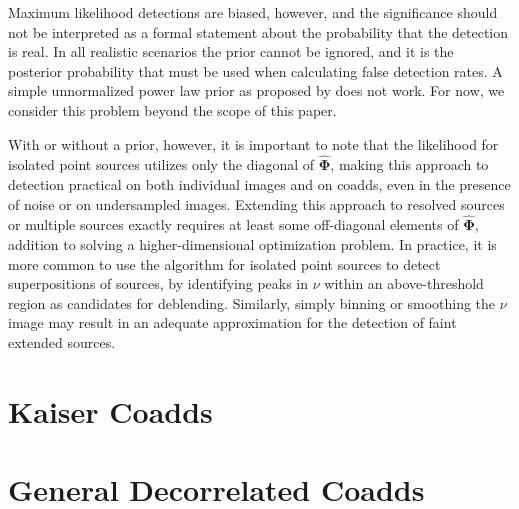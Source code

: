 \documentclass[10pt]{article}
\begin{document}
Maximum likelihood detections are biased, however, and the significance should not be interpreted as a formal statement about the probability that the detection is real.  In all realistic scenarios the prior cannot be ignored, and it is the posterior probability that must be used when calculating false detection rates.  A simple unnormalized power law prior as proposed by \cite{1998PASP..110..727H} does not work.  For now, we consider this problem beyond the scope of this paper.

With or without a prior, however, it is important to note that the likelihood for isolated point sources utilizes only the diagonal of $\hat{\bm{\Phi}}$, making this approach to detection practical on both individual images and on coadds, even in the presence of noise or on undersampled images.  Extending this approach to resolved sources or multiple sources exactly requires at least some off-diagonal elements of $\hat{\bm{\Phi}}$, addition to solving a higher-dimensional optimization problem.  In practice, it is more common to use the algorithm for isolated point sources to detect superpositions of sources, by identifying peaks in $\nu$ within an above-threshold region as candidates for deblending.  Similarly, simply binning or smoothing the $\nu$ image may result in an adequate approximation for the detection of faint extended sources.

\section{Kaiser Coadds}
\label{sec:kaiser-coadds}

\section{General Decorrelated Coadds}
\label{sec:decorrelated-coadds}



\end{document}
